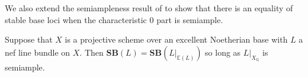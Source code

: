 \documentclass[a4paper,12pt]{book}
\newcommand{\SB}{\mathbf{SB}}
\begin{document}
	We also extend the semiampleness result of \cite{witaszek2020keels} to show that there is an equality of stable base loci when the characteristic $0$ part is semiample.
	
	\begin{theorem}
		Suppose that $X$ is a projective scheme over an excellent Noetherian base with $L$ a nef line bundle on $X$. Then $\SB(L)=\SB(L|_{\mathbb{E}(L)})$ so long as $L|_{X_{\mathbb{Q}}}$ is semiample.
	\end{theorem} 
	 
	
	
	
		
	
	
	
	
	

	
	
	
\end{document}
